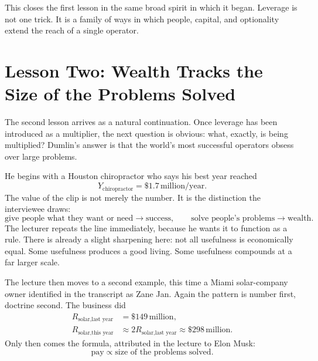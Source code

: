 This closes the first lesson in the same broad spirit in which it began. Leverage is not one trick. It is a family of ways in which people, capital, and optionality extend the reach of a single operator.

\section{Lesson Two: Wealth Tracks the Size of the Problems Solved}

The second lesson arrives as a natural continuation. Once leverage has been introduced as a multiplier, the next question is obvious: what, exactly, is being multiplied? Dumlin's answer is that the world's most successful operators obsess over large problems.

He begins with a Houston chiropractor who says his best year reached
\begin{equation}
Y_{\text{chiropractor}} = \$1.7\,\text{million/year}.
\end{equation}
The value of the clip is not merely the number. It is the distinction the interviewee draws:
\begin{equation}
\text{give people what they want or need} \to \text{success},
\qquad
\text{solve people's problems} \to \text{wealth}.
\end{equation}
The lecturer repeats the line immediately, because he wants it to function as a rule. There is already a slight sharpening here: not all usefulness is economically equal. Some usefulness produces a good living. Some usefulness compounds at a far larger scale.

The lecture then moves to a second example, this time a Miami solar-company owner identified in the transcript as Zane Jan. Again the pattern is number first, doctrine second. The business did
\begin{align}
R_{\text{solar,last year}} &= \$149\,\text{million}, \\
R_{\text{solar,this year}} &\approx 2R_{\text{solar,last year}}
\approx \$298\,\text{million}.
\end{align}
Only then comes the formula, attributed in the lecture to Elon Musk:
\begin{equation}
\text{pay} \propto \text{size of the problems solved}.
\end{equation}

